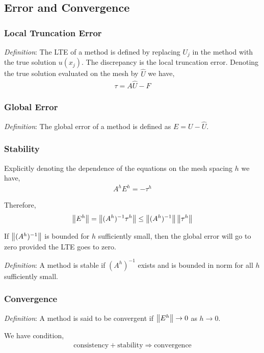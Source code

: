 \documentclass[12pt]{article}
\begin{document}
\subsection{Error and Convergence}

\subsubsection{Local Truncation Error}
\textit{Definition}: The LTE of a method is defined by replacing \( U_j \) in the method with the true solution \( u(x_j) \). The discrepancy is the local truncation error. Denoting the true solution evaluated on the mesh by \( \hat{U} \) we have,
\begin{align*}
    \tau = A \hat{U} - F
\end{align*}


\subsubsection{Global Error}
\textit{Definition}: The global error of a method is defined as \( E = U - \hat{U} \).

\subsubsection{Stability}
Explicitly denoting the dependence of the equations on the mesh spacing \( h \) we have,
\begin{align*}
    A^hE^h = -\tau^h
\end{align*}

Therefore, 
\begin{align*}
    \left\lVert E^h\right\rVert = \left\lVert(A^h)^{-1} \tau^h\right\rVert \leq \left\lVert(A^h)^{-1}\right\rVert\left\lVert\tau^h\right\rVert
\end{align*}

If \( \left\lVert(A^h)^{-1}\right\rVert \) is bounded for \( h \) sufficiently small, then the global error will go to zero provided the LTE goes to zero.

\textit{Definition}: A method is stable if \( (A^h)^{-1} \) exists and is bounded in norm for all \( h \) sufficiently small.

\subsubsection{Convergence}
\textit{Definition}: A method is said to be convergent if \( \left\lVert E^h\right\rVert \to 0 \) as \( h\to 0 \).

We have condition,
\begin{align*}
    \text{consistency} + \text{stability} \Longrightarrow \text{convergence}
\end{align*}
\end{document}
